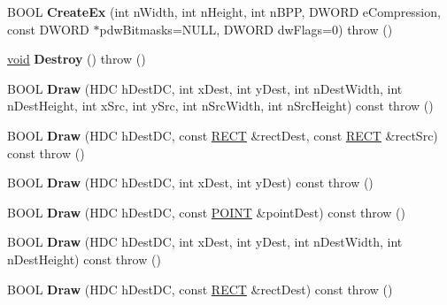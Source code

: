 \begin{DoxyCompactItemize}
B\+O\+OL {\bfseries Create\+Ex} (int n\+Width, int n\+Height, int n\+B\+PP, D\+W\+O\+RD e\+Compression, const D\+W\+O\+RD $\ast$pdw\+Bitmasks=N\+U\+LL, D\+W\+O\+RD dw\+Flags=0)  throw ()
\item 
\mbox{\label{class_a_t_l_1_1_c_image_a656331813b8fe1fa6032aa740ea433ef}} 
\hyperlink{interfacevoid}{void} {\bfseries Destroy} ()  throw ()
\item 
\mbox{\label{class_a_t_l_1_1_c_image_afa945a69ea1d3a892593fce224fbcf67}} 
B\+O\+OL {\bfseries Draw} (H\+DC h\+Dest\+DC, int x\+Dest, int y\+Dest, int n\+Dest\+Width, int n\+Dest\+Height, int x\+Src, int y\+Src, int n\+Src\+Width, int n\+Src\+Height) const  throw ()
\item 
\mbox{\label{class_a_t_l_1_1_c_image_af04b4480737a8f64fe74b8708f7c6b0d}} 
B\+O\+OL {\bfseries Draw} (H\+DC h\+Dest\+DC, const \hyperlink{structtag_r_e_c_t}{R\+E\+CT} \&rect\+Dest, const \hyperlink{structtag_r_e_c_t}{R\+E\+CT} \&rect\+Src) const  throw ()
\item 
\mbox{\label{class_a_t_l_1_1_c_image_a0291a4f418232386f073a970b510fe13}} 
B\+O\+OL {\bfseries Draw} (H\+DC h\+Dest\+DC, int x\+Dest, int y\+Dest) const  throw ()
\item 
\mbox{\label{class_a_t_l_1_1_c_image_a39c4783e91e64aeffb984fcdacd00633}} 
B\+O\+OL {\bfseries Draw} (H\+DC h\+Dest\+DC, const \hyperlink{structtag_p_o_i_n_t}{P\+O\+I\+NT} \&point\+Dest) const  throw ()
\item 
\mbox{\label{class_a_t_l_1_1_c_image_a955c4fb6516a9ec66ae54d1ff87f15ee}} 
B\+O\+OL {\bfseries Draw} (H\+DC h\+Dest\+DC, int x\+Dest, int y\+Dest, int n\+Dest\+Width, int n\+Dest\+Height) const  throw ()
\item 
\mbox{\label{class_a_t_l_1_1_c_image_a8add6f286e143f198a0c721d9fd19309}} 
B\+O\+OL {\bfseries Draw} (H\+DC h\+Dest\+DC, const \hyperlink{structtag_r_e_c_t}{R\+E\+CT} \&rect\+Dest) const  throw ()
\item 
\mbox{\label{class_a_t_l_1_1_c_image_a58007d3dfdb1ff72b75243b11f73e5e5}} 

\end{DoxyCompactItemize}
